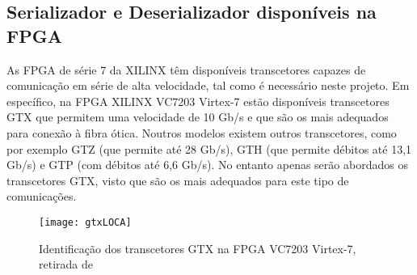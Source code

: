 \subsection{Serializador e Deserializador disponíveis na FPGA}

As FPGA de série 7 da XILINX têm disponíveis transcetores capazes de comunicação em série de alta velocidade, tal como é necessário neste projeto. Em específico, na FPGA XILINX VC7203 Virtex-7 estão disponíveis transcetores GTX que permitem uma velocidade de 10 Gb/s e que são os mais adequados para conexão à fibra ótica. Noutros modelos existem outros transcetores, como por exemplo GTZ (que permite até 28 Gb/s), GTH (que permite débitos até 13,1 Gb/s) e GTP (com débitos até 6,6 Gb/s). No entanto apenas serão abordados os transcetores GTX, visto que são os mais adequados para este tipo de comunicações.

\begin{figure}[h!]
	\begin{center}
		\leavevmode
		\texttt{[image: gtxLOCA]}
		\caption{Identificação dos transcetores GTX na FPGA VC7203 Virtex-7, retirada de \cite{R008}}
		\label{fig:GTXlocalização}
	\end{center}
\end{figure}

